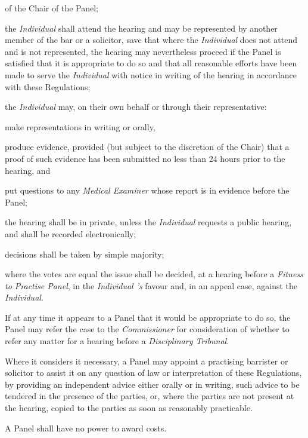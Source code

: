 of the Chair of the Panel;\item the \emph{Individual} shall attend the hearing and may be represented
by another member of the bar or a solicitor, save that where
the \emph{Individual} does not attend and is not represented, the
hearing may nevertheless proceed if the Panel is satisfied that it is
appropriate to do so and that all reasonable efforts have been made to
serve the \emph{Individual} with notice in writing of the hearing in
accordance with these Regulations;\item the \emph{Individual }may, on their own behalf or through their
representative:\al
\item  make representations in writing or orally,\\
\item  produce evidence, provided (but subject to the discretion of the
Chair) that a proof of such evidence has been submitted no less than 24
hours prior to the hearing, and\\
\item put questions to any \emph{Medical Examiner} whose report is in
evidence before the Panel;\la
\item the hearing shall be in private, unless
the \emph{Individual }requests a public hearing, and shall be recorded
electronically;\item decisions shall be taken by simple majority;\item where the votes are equal the issue shall be decided, at a hearing
before a \emph{Fitness to Practise Panel}, in
the \emph{Individual 's} favour and, in an appeal case, against
the \emph{Individual}.\ln
{}\par
If at any time it appears to a Panel that it would be appropriate to do
so, the Panel may refer the case to the \emph{Commissioner} for
consideration of whether to refer any matter for a hearing before
a \emph{Disciplinary Tribunal}. 
\par
Where it considers it necessary, a Panel may appoint a practising
barrister or solicitor to assist it on any question of law or
interpretation of these Regulations, by providing an independent advice
either orally or in writing, such advice to be tendered in the presence
of the parties, or, where the parties are not present at the hearing,
copied to the parties as soon as reasonably practicable.\\
\par
A Panel shall have no power to award costs.\\
